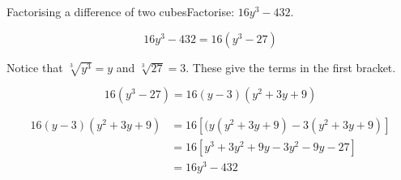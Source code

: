 % 
% 
% 
% 


\begin{wex}{Factorising a difference of two cubes}{Factorise: $16y^{3} - 432$.}
{
\begin{equation*}
  16y^{3} - 432 = 16(y^{3} - 27)
\end{equation*}

Notice that $\sqrt[3]{y^{3}} = y$ and $\sqrt[3]{27} = 3$. These give the terms in the first bracket.

\begin{equation*}
  16(y^{3} - 27) = 16(y-3)(y^{2}+3y+9)
\end{equation*}

\begin{align*}
  16(y-3)(y^{2}+3y+9) &= 16[(y(y^{2}+3y+9)-3(y^{2}+3y+9)]\\
		   &= 16[y^{3}+3y^{2}+9y-3y^{2}-9y-27]\\
		   &= 16y^{3}-432\\
\end{align*}
}
\end{wex}


